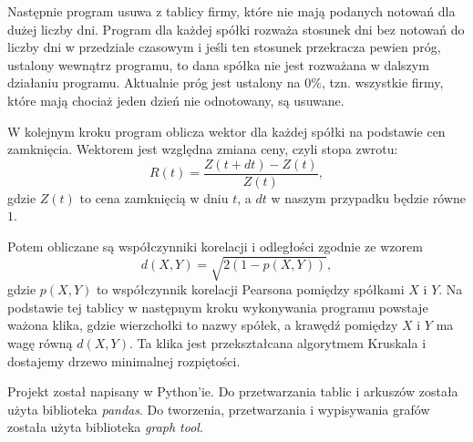 \documentclass{article}
\begin{document}
Następnie program usuwa z tablicy firmy, które
nie mają podanych notowań dla dużej liczby dni.
Program dla każdej spółki rozważa stosunek dni bez notowań do
liczby dni w przedziale czasowym i jeśli ten stosunek przekracza pewien próg,
ustalony wewnątrz programu, to dana spółka nie jest rozważana w dalszym działaniu programu.
Aktualnie próg jest ustalony na $0\%$, tzn. wszystkie firmy, które mają chociaż jeden dzień
nie odnotowany, są usuwane.

W kolejnym kroku program oblicza wektor dla każdej spółki na podstawie cen zamknięcia.
Wektorem jest względna zmiana ceny, czyli stopa zwrotu:
$$ R(t) = \frac{Z(t+dt)-Z(t)}{Z(t)},$$
gdzie $Z(t)$ to cena zamknięcią w dniu $t$, a $dt$ w naszym przypadku będzie równe $1$.

Potem obliczane są współczynniki korelacji i odległości zgodnie ze wzorem
$$ d(X, Y) = \sqrt{2(1 - p(X, Y))}, $$
gdzie $p(X,Y)$ to współczynnik korelacji Pearsona pomiędzy spółkami $X$ i $Y$.
Na podstawie tej tablicy w następnym kroku wykonywania programu powstaje
ważona klika, gdzie wierzchołki to nazwy spółek, a krawędź pomiędzy $X$ i $Y$
ma wagę równą $d(X, Y)$. Ta klika jest przekształcana algorytmem Kruskala
i dostajemy drzewo minimalnej rozpiętości.

Projekt został napisany w Python'ie.
Do przetwarzania tablic i arkuszów została użyta biblioteka \textsl{pandas}.
Do tworzenia, przetwarzania i wypisywania grafów została użyta biblioteka \textsl{graph tool}.


\end{document}
